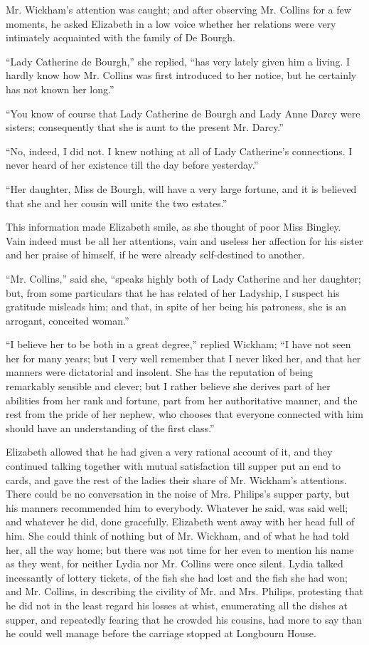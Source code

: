 \documentclass[12pt]{book}
\begin{document}
Mr. Wickham's attention was caught; and after observing Mr. Collins for a few moments, he asked Elizabeth in a low voice whether her relations were very intimately acquainted with the family of De Bourgh.

``Lady Catherine de Bourgh,'' she replied, ``has very lately given him a living. I hardly know how Mr. Collins was first introduced to her notice, but he certainly has not known her long.''

``You know of course that Lady Catherine de Bourgh and Lady Anne Darcy were sisters; consequently that she is aunt to the present Mr. Darcy.''

``No, indeed, I did not. I knew nothing at all of Lady Catherine's connections. I never heard of her existence till the day before yesterday.''

``Her daughter, Miss de Bourgh, will have a very large fortune, and it is believed that she and her cousin will unite the two estates.''

This information made Elizabeth smile, as she thought of poor Miss Bingley. Vain indeed must be all her attentions, vain and useless her affection for his sister and her praise of himself, if he were already self-destined to another.

``Mr. Collins,'' said she, ``speaks highly both of Lady Catherine and her daughter; but, from some particulars that he has related of her Ladyship, I suspect his gratitude misleads him; and that, in spite of her being his patroness, she is an arrogant, conceited woman.''

``I believe her to be both in a great degree,'' replied Wickham; ``I have not seen her for many years; but I very well remember that I never liked her, and that her manners were dictatorial and insolent. She has the reputation of being remarkably sensible and clever; but I rather believe she derives part of her abilities from her rank and fortune, part from her authoritative manner, and the rest from the pride of her nephew, who chooses that everyone connected with him should have an understanding of the first class.''

Elizabeth allowed that he had given a very rational account of it, and they continued talking together with mutual satisfaction till supper put an end to cards, and gave the rest of the ladies their share of Mr. Wickham's attentions. There could be no conversation in the noise of Mrs. Philips's supper party, but his manners recommended him to everybody. Whatever he said, was said well; and whatever he did, done gracefully. Elizabeth went away with her head full of him. She could think of nothing but of Mr. Wickham, and of what he had told her, all the way home; but there was not time for her even to mention his name as they went, for neither Lydia nor Mr. Collins were once silent. Lydia talked incessantly of lottery tickets, of the fish she had lost and the fish she had won; and Mr. Collins, in describing the civility of Mr. and Mrs. Philips, protesting that he did not in the least regard his losses at whist, enumerating all the dishes at supper, and repeatedly fearing that he crowded his cousins, had more to say than he could well manage before the carriage stopped at Longbourn House.
\end{document}
